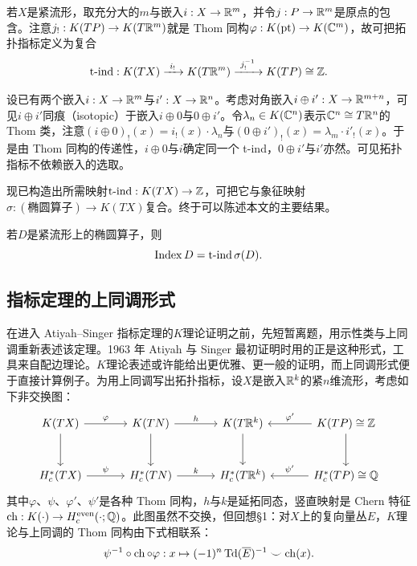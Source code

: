 \begin{definition}
若$X$是紧流形，取充分大的$m$与嵌入$i:X\to\mathbb{R}^m$，并令$j:P\to\mathbb{R}^m$是原点的包含。注意$j_!:K(TP)\to K(T\mathbb{R}^m)$就是 Thom 同构$\varphi:K(\mathrm{pt})\to K(\mathbb{C}^m)$，故可把拓扑指标定义为复合
\[
\tind:K(TX)\xrightarrow{\ i_!\ }K(T\R^m)\xrightarrow{\ j_!^{-1}\ }K(TP)\cong\Z.
\]
\end{definition}

设已有两个嵌入$i:X\to\mathbb{R}^m$与$i':X\to\mathbb{R}^n$。考虑对角嵌入$i\oplus i':X\to\mathbb{R}^{m+n}$，可见$i\oplus i'$同痕（isotopic）于嵌入$i\oplus 0$与$0\oplus i'$。令$\lambda_n\in K(\mathbb{C}^n)$表示$\mathbb{C}^n\cong T\mathbb{R}^n$的 Thom 类，注意$(i\oplus 0)_!(x)=i_!(x)\cdot\lambda_n$与$(0\oplus i')_!(x)=\lambda_m\cdot i'_!(x)$。于是由 Thom 同构的传递性，$i\oplus 0$与$i$确定同一个 t-ind，$0\oplus i'$与$i'$亦然。可见拓扑指标不依赖嵌入的选取。

现已构造出所需映射$\operatorname{t\text{-}ind}:K(TX)\to\mathbb{Z}$，可把它与象征映射$\sigma:(\text{椭圆算子})\to K(TX)$复合。终于可以陈述本文的主要结果。

\begin{theorem}
若$D$是紧流形上的椭圆算子，则
\[
\operatorname{Index} D=\operatorname{t\text{-}ind}\sigma(D).
\]
\end{theorem}


\subsection{指标定理的上同调形式}
在进入 Atiyah–Singer 指标定理的$K$理论证明之前，先短暂离题，用示性类与上同调重新表述该定理。1963 年 Atiyah 与 Singer 最初证明时用的正是这种形式，工具来自配边理论。$K$理论表述或许能给出更优雅、更一般的证明，而上同调形式便于直接计算例子。为用上同调写出拓扑指标，设$X$是嵌入$\mathbb{R}^k$的紧$n$维流形，考虑如下非交换图：
\[
\begin{tikzcd}[column sep=3.4em,row sep=2.8em]
K(TX)\arrow[r,"\varphi"]\arrow[d] & K(TN)\arrow[r,"h"]\arrow[d] & K(T\R^k)\arrow[d] & K(TP)\cong\Z\arrow[l,"\varphi'"']\arrow[d]\\
H^*_c(TX)\arrow[r,"\psi"] & H^*_c(TN)\arrow[r,"k"] & H^*_c(T\R^k) & H^*_c(TP)\cong\Q\arrow[l,"\psi'"']
\end{tikzcd}
\]
其中$\varphi$、$\psi$、$\varphi'$、$\psi'$是各种 Thom 同构，$h$与$k$是延拓同态，竖直映射是 Chern 特征$\operatorname{ch}:K(\cdot)\to H^{\mathrm{even}}_c(\cdot;\mathbb{Q})$。此图虽然不交换，但回想§1：对$X$上的复向量丛$E$，$K$理论与上同调的 Thom 同构由下式相联系：
\[
\psi^{-1}\circ\operatorname{ch}\circ\varphi:x\mapsto(-1)^n\operatorname{Td}(\overline{E})^{-1}\smile\operatorname{ch}(x).
\]

